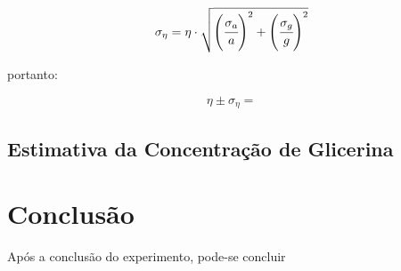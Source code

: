 \documentclass[english,brazil]{article}
\begin{document}
			\begin{equation}
				\sigma_{\eta} = \eta\cdot\sqrt{\left(\cfrac{\sigma_{a}}{a}\right)^{2}+\left(\cfrac{\sigma_{g}}{g}\right)^{2}}
			\end{equation}


			portanto:

			$$\eta\pm\sigma_{\eta}=$$


		\subsection{Estimativa da Concentração de Glicerina}


	\section{Conclusão}

	Após a conclusão do experimento, pode-se concluir
	
\end{document}
